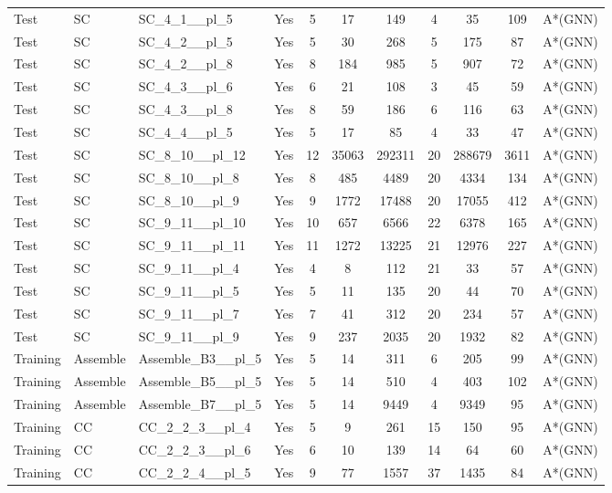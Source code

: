 \documentclass{article}
\begin{document}
\begin{tabular}{lllcccccccc}
Test & SC & SC\_4\_1\_\_pl\_5 & Yes & 5 & 17 & 149 & 4 & 35 & 109 & A*(GNN) \\
Test & SC & SC\_4\_2\_\_pl\_5 & Yes & 5 & 30 & 268 & 5 & 175 & 87 & A*(GNN) \\
Test & SC & SC\_4\_2\_\_pl\_8 & Yes & 8 & 184 & 985 & 5 & 907 & 72 & A*(GNN) \\
Test & SC & SC\_4\_3\_\_pl\_6 & Yes & 6 & 21 & 108 & 3 & 45 & 59 & A*(GNN) \\
Test & SC & SC\_4\_3\_\_pl\_8 & Yes & 8 & 59 & 186 & 6 & 116 & 63 & A*(GNN) \\
Test & SC & SC\_4\_4\_\_pl\_5 & Yes & 5 & 17 & 85 & 4 & 33 & 47 & A*(GNN) \\
Test & SC & SC\_8\_10\_\_pl\_12 & Yes & 12 & 35063 & 292311 & 20 & 288679 & 3611 & A*(GNN) \\
Test & SC & SC\_8\_10\_\_pl\_8 & Yes & 8 & 485 & 4489 & 20 & 4334 & 134 & A*(GNN) \\
Test & SC & SC\_8\_10\_\_pl\_9 & Yes & 9 & 1772 & 17488 & 20 & 17055 & 412 & A*(GNN) \\
Test & SC & SC\_9\_11\_\_pl\_10 & Yes & 10 & 657 & 6566 & 22 & 6378 & 165 & A*(GNN) \\
Test & SC & SC\_9\_11\_\_pl\_11 & Yes & 11 & 1272 & 13225 & 21 & 12976 & 227 & A*(GNN) \\
Test & SC & SC\_9\_11\_\_pl\_4 & Yes & 4 & 8 & 112 & 21 & 33 & 57 & A*(GNN) \\
Test & SC & SC\_9\_11\_\_pl\_5 & Yes & 5 & 11 & 135 & 20 & 44 & 70 & A*(GNN) \\
Test & SC & SC\_9\_11\_\_pl\_7 & Yes & 7 & 41 & 312 & 20 & 234 & 57 & A*(GNN) \\
Test & SC & SC\_9\_11\_\_pl\_9 & Yes & 9 & 237 & 2035 & 20 & 1932 & 82 & A*(GNN) \\
Training & Assemble & Assemble\_B3\_\_pl\_5 & Yes & 5 & 14 & 311 & 6 & 205 & 99 & A*(GNN) \\
Training & Assemble & Assemble\_B5\_\_pl\_5 & Yes & 5 & 14 & 510 & 4 & 403 & 102 & A*(GNN) \\
Training & Assemble & Assemble\_B7\_\_pl\_5 & Yes & 5 & 14 & 9449 & 4 & 9349 & 95 & A*(GNN) \\
Training & CC & CC\_2\_2\_3\_\_pl\_4 & Yes & 5 & 9 & 261 & 15 & 150 & 95 & A*(GNN) \\
Training & CC & CC\_2\_2\_3\_\_pl\_6 & Yes & 6 & 10 & 139 & 14 & 64 & 60 & A*(GNN) \\
Training & CC & CC\_2\_2\_4\_\_pl\_5 & Yes & 9 & 77 & 1557 & 37 & 1435 & 84 & A*(GNN) \\

\end{tabular}
\end{document}
